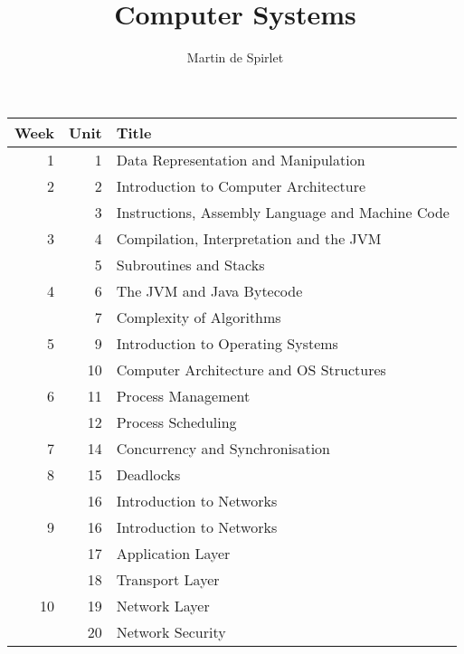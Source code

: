 \documentclass[
  11pt,
  a4paper,
]{article}
\title{Computer Systems}
\author{Martin de Spirlet}
\date{}
\begin{document}

\maketitle

\vspace*{\fill}

\begin{table}[htp]
  \centering
  \begin{tabular}{rrl}
    \toprule
    Week & Unit & Title \\
    \midrule
     1 &  1 & Data Representation and Manipulation \\[1ex]
     2 &  2 & Introduction to Computer Architecture \\
       &  3 & Instructions, Assembly Language and Machine Code \\[1ex]
     3 &  4 & Compilation, Interpretation and the JVM \\
       &  5 & Subroutines and Stacks \\[1ex]
     4 &  6 & The JVM and Java Bytecode \\
       &  7 & Complexity of Algorithms \\[1ex]
     5 &  9 & Introduction to Operating Systems \\
       & 10 & Computer Architecture and OS Structures \\[1ex]
     6 & 11 & Process Management \\
       & 12 & Process Scheduling \\[1ex]
     7 & 14 & Concurrency and Synchronisation \\[1ex]
     8 & 15 & Deadlocks \\
       & 16 & Introduction to Networks \\[1ex]
     9 & 16 & Introduction to Networks \\
       & 17 & Application Layer \\
       & 18 & Transport Layer \\[1ex]
    10 & 19 & Network Layer \\
       & 20 & Network Security \\
    \bottomrule
  \end{tabular}
\end{table}

\vspace*{\fill}
\addvspace{1in}

\clearpage

\end{document}
